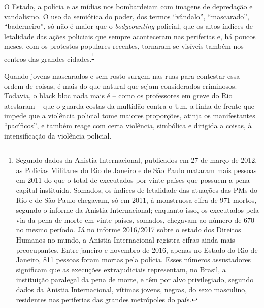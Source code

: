 O Estado, a polícia e as mídias nos bombardeiam com imagens de
depredação e vandalismo. O uso da semiótica do poder, dos termos
``vândalo'', ``mascarado'', ``baderneiro'', só não é maior que o
\emph{bodycounting} policial, que os altos índices de letalidade das
ações policiais que sempre aconteceram nas periferias e, há poucos
meses, com os protestos populares recentes, tornaram-se visíveis também
nos centros das grandes cidades.\textsuperscript{\footnote{Segundo dados
  da Anistia Internacional, publicados em 27 de março de 2012, as
  Polícias Militares do Rio de Janeiro e de São Paulo mataram mais
  pessoas em 2011 do que o total de executados por vinte países que
  possuem a pena capital instituída. Somados, os índices de letalidade
  das atuações das PMs do Rio e de São Paulo chegavam, só em 2011, à
  monstruosa cifra de 971 mortos, segundo o informe da Anistia
  Internacional; enquanto isso, os executados pela via da pena de morte
  em vinte países, somados, chegavam ao número de 670 no mesmo período.
  Já no informe 2016/2017 sobre o estado dos Direitos Humanos no mundo,
  a Anistia Internacional registra cifras ainda mais preocupantes. Entre
  janeiro e novembro de 2016, apenas no Estado do Rio de Janeiro, 811
  pessoas foram mortas pela polícia. Esses números assustadores
  significam que as execuções extrajudiciais representam, no Brasil, a
  instituição paralegal da pena de morte, e têm por alvo privilegiado,
  segundo dados da Anistia Internacional, vítimas jovens, negras, do
  sexo masculino, residentes nas periferias das grandes metrópoles do
  país.}}

Quando jovens mascarados e sem rosto surgem nas ruas para contestar essa
ordem de coisas, é mais do que natural que sejam considerados
criminosos. Todavia, o black bloc nada mais é -- como os professores em
greve do Rio atestaram -- que o guarda-costas da multidão contra o Um, a
linha de frente que impede que a violência policial tome maiores
proporções, atinja os manifestantes ``pacíficos'', e também reage com
certa violência, simbólica e dirigida a coisas, à intensificação da
violência policial.

